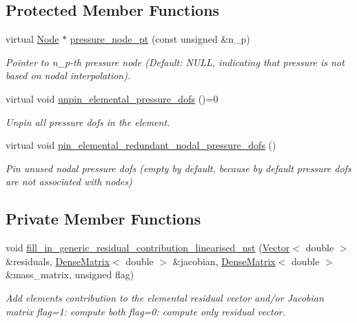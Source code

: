 \subsection*{Protected Member Functions}
\begin{DoxyCompactItemize}
\item 
virtual \hyperlink{classoomph_1_1Node}{Node} $\ast$ \hyperlink{classoomph_1_1RefineableLinearisedNavierStokesEquations_abb2f7a5ecb5695a12d44929a8ffe822b}{pressure\+\_\+node\+\_\+pt} (const unsigned \&n\+\_\+p)
\begin{DoxyCompactList}\small\item\em Pointer to n\+\_\+p-\/th pressure node (Default\+: N\+U\+LL, indicating that pressure is not based on nodal interpolation). \end{DoxyCompactList}\item 
virtual void \hyperlink{classoomph_1_1RefineableLinearisedNavierStokesEquations_adb7699bbdef97e298a775f5f43b1f2a6}{unpin\+\_\+elemental\+\_\+pressure\+\_\+dofs} ()=0
\begin{DoxyCompactList}\small\item\em Unpin all pressure dofs in the element. \end{DoxyCompactList}\item 
virtual void \hyperlink{classoomph_1_1RefineableLinearisedNavierStokesEquations_ab75b06f5beca6c7ce405a9e91a15c708}{pin\+\_\+elemental\+\_\+redundant\+\_\+nodal\+\_\+pressure\+\_\+dofs} ()
\begin{DoxyCompactList}\small\item\em Pin unused nodal pressure dofs (empty by default, because by default pressure dofs are not associated with nodes) \end{DoxyCompactList}\end{DoxyCompactItemize}
\subsection*{Private Member Functions}
\begin{DoxyCompactItemize}
\item 
void \hyperlink{classoomph_1_1RefineableLinearisedNavierStokesEquations_afb1a09529a1655020ff037c37f00b201}{fill\+\_\+in\+\_\+generic\+\_\+residual\+\_\+contribution\+\_\+linearised\+\_\+nst} (\hyperlink{classoomph_1_1Vector}{Vector}$<$ double $>$ \&residuals, \hyperlink{classoomph_1_1DenseMatrix}{Dense\+Matrix}$<$ double $>$ \&jacobian, \hyperlink{classoomph_1_1DenseMatrix}{Dense\+Matrix}$<$ double $>$ \&mass\+\_\+matrix, unsigned flag)
\begin{DoxyCompactList}\small\item\em Add element\textquotesingle{}s contribution to the elemental residual vector and/or Jacobian matrix flag=1\+: compute both flag=0\+: compute only residual vector. \end{DoxyCompactList}\end{DoxyCompactItemize}
